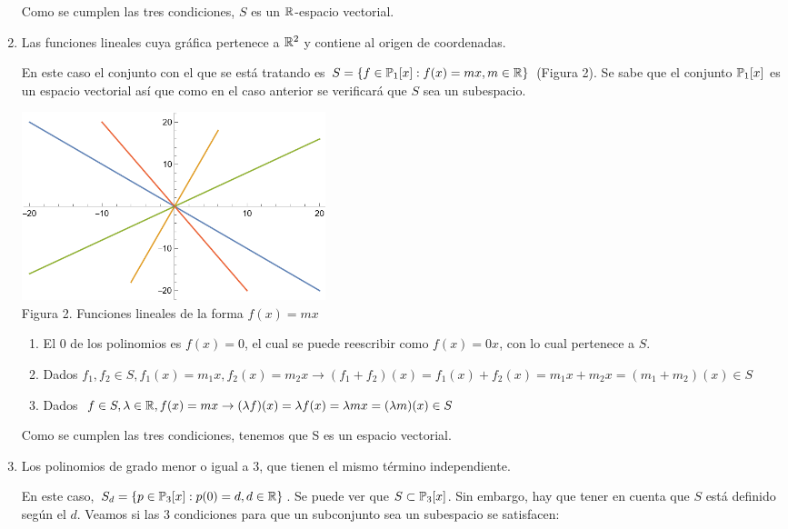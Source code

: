\begin{enumerate}
\begin{mdframed}[style=s]
\begin{enumerate}
                \end{enumerate}
                Como se cumplen las tres condiciones, $S$ es un $\mathbb{R}$-espacio vectorial.
            \end{mdframed}
        \item Las funciones lineales cuya gráfica pertenece a $\mathbb{R}^2$ y contiene al origen de coordenadas.
            \begin{mdframed}[style=s]
                En este caso el conjunto con el que se está tratando es $S=\{f\in \mathbb{P}_1[x]:f(x)=mx, m\in\mathbb{R}\}$ (Figura 2). Se sabe que el conjunto $\mathbb{P}_1[x]$ es un espacio vectorial así que como en el caso anterior se verificará que $S$ sea un subespacio.
                \begin{center}
                    \includegraphics[width=0.4\textwidth]{Ej1b.png}\\
                    Figura 2. Funciones lineales de la forma $f(x)=mx$
                \end{center}
                \begin{enumerate}
                    \item El $0$ de los polinomios es $f(x)=0$, el cual se puede reescribir como $f(x)=0x$, con lo cual pertenece a $S$.
                    \item Dados $f_1,f_2\in S, f_1(x)=m_1x,f_2(x)=m_2x\to (f_1 + f_2)(x)=f_1(x)+f_2(x)=m_1x+m_2x=(m_1+m_2)(x)\in S$
                    \item Dados $f\in S, \lambda \in \mathbb{R}, f(x)=mx\to (\lambda f)(x)=\lambda f(x)=\lambda mx=(\lambda m)(x)\in S$
                \end{enumerate}
                Como se cumplen las tres condiciones, tenemos que S es un espacio vectorial.    
            \end{mdframed}
        \item Los polinomios de grado menor o igual a 3, que tienen el mismo término independiente.
            \begin{mdframed}[style=s]
                En este caso, $S_d=\{p\in \mathbb{P}_3[x]: p(0)=d, d\in \mathbb{R}\}$. Se puede ver que $S\subset\mathbb{P}_3[x]$. Sin embargo, hay que tener en cuenta que $S$ está definido según el $d$. Veamos si las 3 condiciones para que un subconjunto sea un subespacio se satisfacen:

\end{mdframed}
\end{enumerate}
